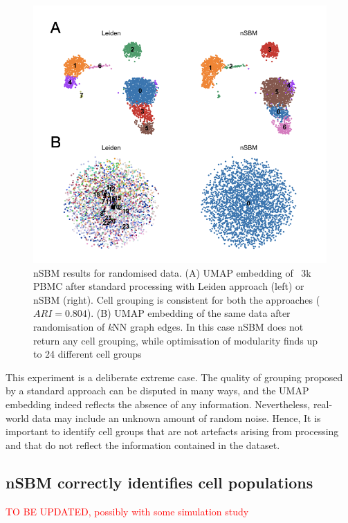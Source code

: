 \documentclass[10pt]{article}
\begin{document}
\begin{figure}[H]
\centering
\includegraphics[keepaspectratio,width=\textwidth,height=0.4\textheight]{FIgure_Random.png}
\caption[]{nSBM results for randomised data. (A) UMAP embedding of ~3k PBMC after standard processing with Leiden approach (left) or nSBM (right). Cell grouping is consistent for both the approaches ($ARI=0.804$). (B) UMAP embedding of the same data after randomisation of \emph{k}NN graph edges. In this case nSBM does not return any cell grouping, while optimisation of modularity finds up to 24 different cell groups}\label{FigureRandom}
\end{figure}

This experiment is a deliberate extreme case. The quality of grouping proposed by a standard approach can be disputed in many ways, and the UMAP embedding indeed reflects the absence of any information. Nevertheless, real-world data may include an unknown amount of random noise. Hence, It is important to identify cell groups that are not artefacts arising from processing and that do not reflect the information contained in the dataset. 

\subsection*{nSBM correctly identifies cell populations}

\textcolor{red}{TO BE UPDATED, possibly with some simulation study}
\end{document}
